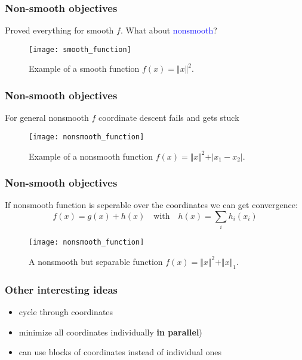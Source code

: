 \documentclass[aspectratio=149]{beamer}
\begin{document}
\begin{frame}
  \frametitle{Non-smooth objectives}
  Proved everything for smooth $f$. What about \textcolor{blue}{nonsmooth}?
  \begin{figure}[ht]
    \centering
    \texttt{[image: smooth\_function]}
    \caption{Example of a smooth function $f(x)= \Vert x \Vert^2$.}
  \end{figure}
\end{frame}


\begin{frame}
  \frametitle{Non-smooth objectives}
  For general nonsmooth $f$ coordinate descent fails and gets stuck
  \begin{figure}[ht]
    \centering
    \texttt{[image: nonsmooth\_function]}
    \caption{Example of a nonsmooth function $f(x)= \Vert x \Vert^2 + \vert x_1 - x_2 \vert$.}
  \end{figure}
\end{frame}


\begin{frame}
  \frametitle{Non-smooth objectives}
  If nonsmooth function is seperable over the coordinates we can get convergence:
  \begin{equation}
    f(x) = g(x) + h(x) \quad \text{with} \quad h(x)= \sum_{i} h_i(x_i)
  \end{equation}
  \begin{figure}[ht]
    \centering
    \texttt{[image: nonsmooth\_function]}
    \caption{A nonsmooth but separable function $f(x)= \Vert x \Vert^2 + \Vert x \Vert_1$.}
  \end{figure}
\end{frame}


\begin{frame}
  \frametitle{Other interesting ideas}
  \begin{itemize}
    \item cycle through coordinates
    \item minimize all coordinates individually \textbf{in parallel})
    \item can use blocks of coordinates instead of individual ones
  \end{itemize}
\end{frame}
\end{document}
